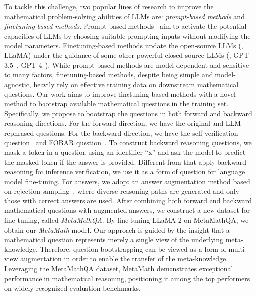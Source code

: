     \vspace{-0.25mm}
    
    To tackle this challenge, two popular lines of research to improve the mathematical problem-solving abilities of LLMs are: \emph{prompt-based methods} and \emph{finetuning-based methods}. Prompt-based methods~\cite{wei2022chain,fu2023complexitybased,wang2023selfconsistency,zhou2023leasttomost,xiong2023dq,xin2023lego} aim to activate the potential capacities of LLMs by choosing suitable prompting inputs without modifying the model parameters. Finetuning-based methods update the open-source LLMs (\eg, LLaMA) under the guidance of some other powerful closed-source LLMs (\eg, GPT-3.5~\cite{gpt3-5}, GPT-4~\cite{gpt4}). While prompt-based methods are model-dependent and sensitive to many factors, finetuning-based methods, despite being simple and model-agnostic, heavily rely on effective training data on downstream mathematical questions. Our work aims to improve finetuning-based methods with a novel method to bootstrap available mathematical questions in the training set. 
    Specifically, we propose to bootstrap the questions in both forward and backward reasoning directions. For the forward direction, we have the original and LLM-rephrased questions. For the backward direction, we have the self-verification question~\cite{weng2023large} and FOBAR question~\cite{jiang2023backward}. To construct backward reasoning questions, we mask a token in a question using an identifier ``x'' and ask the model to predict the masked token if the answer is provided. Different from \cite{weng2023large,jiang2023backward} that apply backward reasoning for inference verification, we use it as a form of question for language model fine-tuning. For answers, we adopt an answer augmentation method based on rejection sampling~\cite{yuan2023scaling}, where diverse reasoning paths are generated and only those with correct answers are used. After combining both forward and backward mathematical questions with augmented answers, we construct a new dataset for fine-tuning, called \emph{MetaMathQA}. By fine-tuning LLaMA-2 on MetaMathQA, we obtain our \emph{MetaMath} model. Our approach is guided by the insight that a mathematical question represents merely a single view of the underlying meta-knowledge. Therefore, question bootstrapping can be viewed as a form of multi-view augmentation in order to enable the transfer of the meta-knowledge. Leveraging the MetaMathQA dataset, MetaMath demonstrates exceptional performance in mathematical reasoning, positioning it among the top performers on widely recognized evaluation benchmarks.

